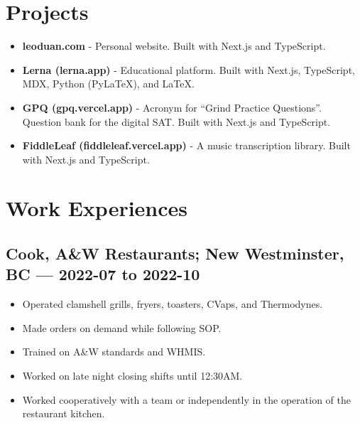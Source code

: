\documentclass{article}
\begin{document}
\section*{Projects}

\begin{itemize}
    \item \textbf{leoduan.com} - Personal website. Built with Next.js and TypeScript.
    \item \textbf{Lerna (lerna.app)} - Educational platform. Built with Next.js, TypeScript, MDX, Python (PyLaTeX), and LaTeX.
    \item \textbf{GPQ (gpq.vercel.app)} - Acronym for ``Grind Practice Questions''. Question bank for the digital SAT. Built with Next.js and TypeScript.
    \item \textbf{FiddleLeaf (fiddleleaf.vercel.app)} - A music transcription library. Built with Next.js and TypeScript.
\end{itemize}

\section*{Work Experiences}

\subsection*{Cook, A\&W Restaurants; New Westminster, BC — 2022-07 to 2022-10}

\begin{itemize}
    \item Operated clamshell grills, fryers, toasters, CVaps, and Thermodynes.
    \item Made orders on demand while following SOP.
    \item Trained on A\&W standards and WHMIS.
    \item Worked on late night closing shifts until 12:30AM.
    \item Worked cooperatively with a team or independently in the operation of the restaurant kitchen.
\end{itemize}


\end{document}

